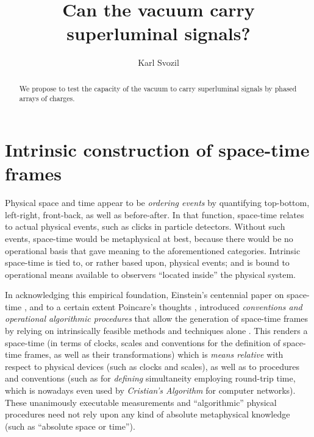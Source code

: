 \documentclass[%
  preprint,
 showpacs,
 showkeys,
 preprintnumbers,
 amsmath,amssymb,
 aps,
  pra,
  longbibliography,
 ]{revtex4-1}
\begin{document}
\title{Can the vacuum carry superluminal signals?}


\author{Karl Svozil}
 



\begin{abstract}
We propose to test the capacity of the vacuum to carry superluminal signals by phased arrays of charges.
\end{abstract}

\maketitle



\section{Intrinsic construction of space-time frames}

Physical space and time appear to be {\em ordering events} by quantifying top-bottom, left-right, front-back, as well as before-after.
In that function, space-time relates to actual physical events, such as clicks in particle detectors.
Without such events, space-time would be metaphysical at best, because there would be no operational basis
that gave meaning to the aforementioned categories.
Intrinsic space-time is tied to, or rather based upon, physical events;
and is bound to operational means available to observers ``located inside'' the physical system.

In acknowledging this empirical foundation,
Einstein's centennial paper on space-time \cite{ein-05,naber},
and to a certain extent Poincare's thoughts \cite{poincare02}, introduced
{\em conventions and operational algorithmic procedures} that allow
the generation of space-time frames by relying on intrinsically feasible methods and techniques alone \cite{toffoli:79,svozil-94}.
This renders a space-time (in terms of clocks, scales and conventions for
the definition of space-time frames, as well as their transformations) which
is {\em means relative} \cite{Myrvold2011237} with respect to physical devices (such as clocks and scales), as well as
to procedures and conventions
(such as for {\em defining} simultaneity employing round-trip time, which is
nowadays even used by {\em Cristian's Algorithm} for computer networks).
These unanimously executable measurements and ``algorithmic'' physical procedures
need not rely upon any kind of absolute metaphysical knowledge (such as ``absolute space or time'').
\end{document}
